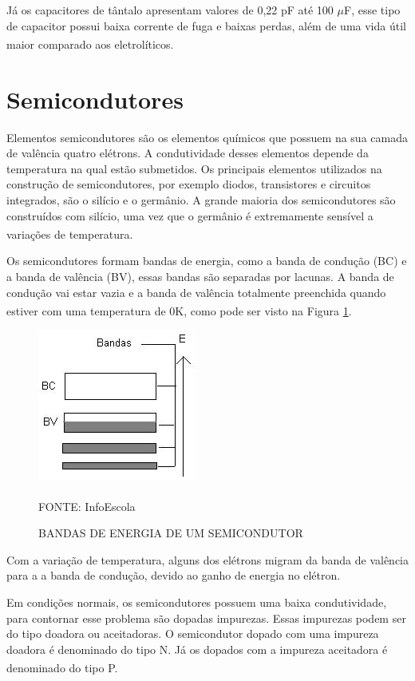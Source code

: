 \documentclass[
	12pt,				%
	openright,			%
	oneside,			%
	a4paper,			%
	english,			%
	french,				%
	spanish,			%
	brazil,				%
	oldfontcommands
	]{abntex2}
\begin{document}
	Já os capacitores de tântalo apresentam valores de 0,22 pF até 100 $\mu$F, esse tipo de capacitor possui baixa corrente de fuga e baixas perdas, além de uma vida útil maior comparado aos eletrolíticos.\textsuperscript{\cite{x7r}}

\section[Semicondutores]{Semicondutores}

Elementos semicondutores são os elementos químicos que possuem na sua camada de valência quatro elétrons. A condutividade desses elementos depende da temperatura na qual estão submetidos. Os principais elementos utilizados na construção de semicondutores, por exemplo diodos, transistores e circuitos integrados, são o silício e o germânio. A grande maioria dos semicondutores são construídos com silício, uma vez que o germânio é extremamente sensível a variações de temperatura.\textsuperscript{\cite{semicondutores}}
	
	Os semicondutores formam bandas de energia, como a banda de condução (BC) e a banda de valência (BV), essas bandas são separadas por lacunas. A banda de condução vai estar vazia e a banda de valência totalmente preenchida quando estiver com uma temperatura de 0K, como pode ser visto na Figura \ref{Fig_bandas}.\textsuperscript{\cite{semicondutores2}}
	
	\begin{figure}[th]
		\caption{BANDAS DE ENERGIA DE UM SEMICONDUTOR}
		\label{Fig_bandas}
		\centering
		\includegraphics[width=0.3\linewidth]{./figs/banda}
			
		\begin{small}
			FONTE: InfoEscola\textsuperscript{\cite{semicondutores2}}
		\end{small}		
	\end{figure}

	Com a variação de temperatura, alguns dos elétrons migram da banda de valência para a a banda de condução, devido ao ganho de energia no elétron.

	Em condições normais, os semicondutores possuem uma baixa condutividade, para contornar esse problema são dopadas impurezas. Essas impurezas podem ser do tipo doadora ou aceitadoras. O semicondutor dopado com uma impureza doadora é denominado do tipo N. Já os dopados com a impureza aceitadora é denominado do tipo P.\textsuperscript{\cite{semicondutores2}}
	
\end{document}
